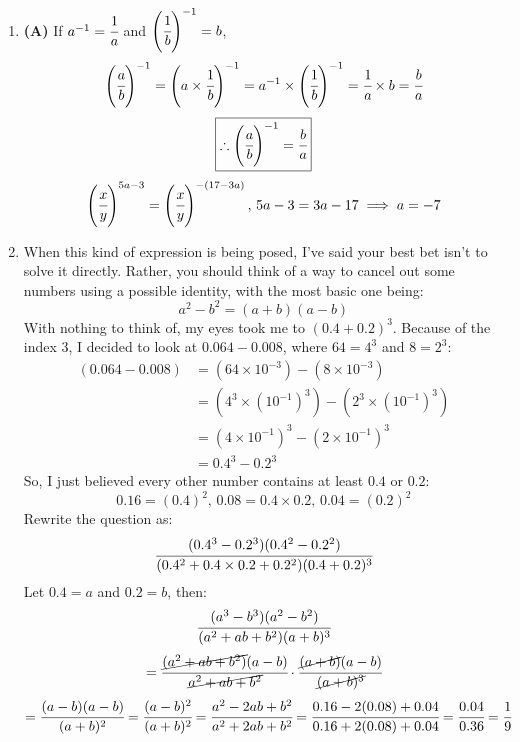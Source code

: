 \begin{multicols}{2}
\begin{enumerate}[label={\arabic*.}]
\item \textbf{(A)} If \( a^{-1} = \cfrac{1}{a} \) and \( \left(\cfrac{1}{b}\right)^{-1} = b \),
    \[\left(\cfrac{a}{b}\right)^{-1} = \left(a \times \cfrac{1}{b}\right)^{-1} = a^{-1} \times \left(\cfrac{1}{b}\right)^{-1} = \cfrac{1}{a} \times b = \cfrac{b}{a}\]
    \[\boxed{\therefore \left(\cfrac{a}{b}\right)^{-1} = \cfrac{b}{a}}\]
    \[\left(\cfrac{x}{y}\right)^{5a - 3} = \left(\cfrac{x}{y}\right)^{-(17 - 3a)}, \, 5a - 3 = 3a - 17 \implies a = -7\]

    \item When this kind of expression is being posed, I've said your best bet isn't to solve it directly. Rather, you should think of a way to cancel out some numbers using a possible identity, with the most basic one being:
    \[a^2 - b^2 = (a + b)(a - b)\]
    With nothing to think of, my eyes took me to \( (0.4 + 0.2)^3 \). Because of the index 3, I decided to look at \( 0.064 - 0.008 \), where \( 64 = 4^3 \) and \( 8 = 2^3 \):
    \begin{align*}
    (0.064 - 0.008) &= (64 \times 10^{-3}) - (8 \times 10^{-3}) \\
    &= (4^3 \times (10^{-1})^3) - (2^3 \times (10^{-1})^3) \\
    &= (4 \times 10^{-1})^3 - (2 \times 10^{-1})^3 \\
    &= 0.4^3 - 0.2^3
    \end{align*}
    So, I just believed every other number contains at least \( 0.4 \) or \( 0.2 \):
    \[0.16 = (0.4)^2, \, 0.08 = 0.4 \times 0.2, \, 0.04 = (0.2)^2\]
    Rewrite the question as:
    \[\cfrac{(0.4^3 - 0.2^3)(0.4^2 - 0.2^2)}{(0.4^2 + 0.4 \times 0.2 + 0.2^2)(0.4 + 0.2)^3}\]
    Let \( 0.4 = a \) and \( 0.2 = b \), then:
    \[\cfrac{(a^3 - b^3)(a^2 - b^2)}{(a^2 + ab + b^2)(a + b)^3}\]
    \[= \cfrac{\cancel{(a^2 + ab + b^2)}(a - b)}{\cancel{a^2 + ab + b^2}} \cdot \cfrac{\cancel{(a + b)}(a - b)}{\cancel{(a + b)^3}} \]
    \[ = \cfrac{(a - b)(a - b)}{(a + b)^2} = \cfrac{(a - b)^2}{(a + b)^2} = \cfrac{a^2 - 2ab + b^2}{a^2 + 2ab + b^2} = \cfrac{0.16 - 2(0.08) + 0.04}{0.16 + 2(0.08) + 0.04} = \cfrac{0.04}{0.36} = \cfrac{1}{9}\]  


\end{enumerate}
\end{multicols}
